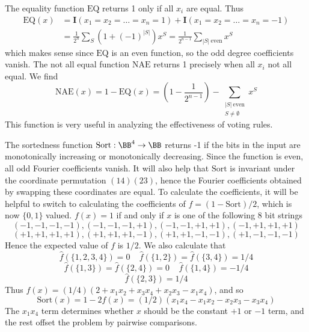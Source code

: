 \begin{example}
    The equality function $\text{EQ}$ returns 1 only if all $x_i$ are equal. Thus
    \begin{align*}
        \text{EQ}(x) &= \mathbf{I}(x_1 = x_2 = \dots = x_n = 1) + \mathbf{I}(x_1 = x_2 = \dots = x_n = -1)\\
        &= \frac{1}{2^n} \sum_S (1 + (-1)^{|S|}) x^S = \frac{1}{2^{n-1}} \sum_{|S|\ \text{even}} x^S
    \end{align*}
    which makes sense since $\text{EQ}$ is an even function, so the odd degree coefficients vanish. The not all equal function $\text{NAE}$ returns 1 precisely when all $x_i$ not all equal. We find
    \[ \text{NAE}(x) = 1 - \text{EQ}(x) = \left( 1 - \frac{1}{2^{n-1}} \right) - \sum_{\substack{|S|\ \text{even}\\S \neq \emptyset}} x^S \]
    This function is very useful in analyzing the effectiveness of voting rules.
\end{example}

\begin{example}
    The sortedness function $\text{Sort} : \BB^4 \to \BB$ returns -1 if the bits in the input are monotonically increasing or monotonically decreasing. Since the function is even, all odd Fourier coefficients vanish. It will also help that $\text{Sort}$ is invariant under the coordinate permutation $(1 4)(2 3)$, hence the Fourier coefficients obtained by swapping these coordinates are equal. To calculate the coefficients, it will be helpful to switch to calculating the coefficients of $f = (1 - \text{Sort})/2$, which is now $\{ 0, 1 \}$ valued. $f(x) = 1$ if and only if $x$ is one of the following 8 bit strings
    \[ (-1,-1,-1,-1), (-1,-1,-1,+1), (-1,-1,+1,+1), (-1,+1,+1,+1) \]
    \[ (+1,+1,+1,+1), (+1,+1,+1,-1), (+1,+1,-1,-1), (+1,-1,-1,-1) \]
    Hence the expected value of $f$ is $1/2$. We also calculate that
    \[ \widehat{f}(\{1,2,3,4\}) = 0\ \ \ \ \ \widehat{f}(\{1,2\}) = \widehat{f}(\{3,4\}) = 1/4 \]
    \[ \widehat{f}(\{ 1, 3 \}) = \widehat{f}(\{2,4\}) = 0\ \ \ \ \ \widehat{f}(\{1,4\}) = -1/4 \]
    \[ \widehat{f}(\{2,3\}) = 1/4 \]
    Thus $f(x) = (1/4)(2 + x_1x_2 + x_3x_4 + x_2x_3 - x_1x_4)$, and so
    \[ \text{Sort}(x) = 1 - 2f(x) = (1/2)(x_1x_4 - x_1x_2 - x_2x_3 - x_3x_4) \]
    The $x_1x_4$ term determines whether $x$ should be the constant $+1$ or $-1$ term, and the rest offset the problem by pairwise comparisons.
\end{example}


